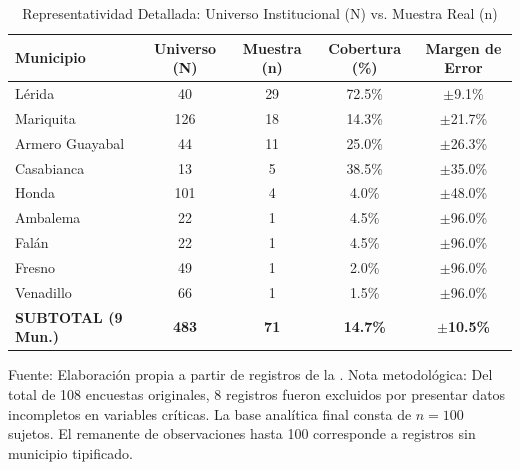 \documentclass[11pt,a4paper]{article}
\begin{document}
\begin{table}[H]
\centering
\caption{Representatividad Detallada: Universo Institucional (N) vs. Muestra Real (n)}
\small
\begin{tabular}{@{}lcccc@{}}
\toprule
\textbf{Municipio} & \textbf{Universo (N)} & \textbf{Muestra (n)} & \textbf{Cobertura (\%)} & \textbf{Margen de Error} \\ \midrule
L\'erida             & 40                     & 29                   & 72.5\%                     & $\pm$9.1\%               \\
Mariquita          & 126                    & 18                   & 14.3\%                     & $\pm$21.7\%              \\
Armero Guayabal    & 44                     & 11                   & 25.0\%                     & $\pm$26.3\%              \\
Casabianca         & 13                     & 5                    & 38.5\%                     & $\pm$35.0\%              \\
Honda              & 101                    & 4                    & 4.0\%                      & $\pm$48.0\%              \\
Ambalema           & 22                     & 1                    & 4.5\%                      & $\pm$96.0\%              \\
Fal\'an              & 22                     & 1                    & 4.5\%                      & $\pm$96.0\%              \\
Fresno             & 49                     & 1                    & 2.0\%                      & $\pm$96.0\%              \\
Venadillo          & 66                     & 1                    & 1.5\%                      & $\pm$96.0\%              \\ \midrule
\textbf{SUBTOTAL (9 Mun.)} & \textbf{483}   & \textbf{71}          & \textbf{14.7\%}            & \textbf{$\pm$10.5\%}     \\ \bottomrule
\end{tabular}
\par\smallskip
\footnotesize{Fuente: Elaboraci\'on propia a partir de registros de la \citet{camara2025}. Nota metodológica: Del total de 108 encuestas originales, 8 registros fueron excluidos por presentar datos incompletos en variables críticas. La base analítica final consta de $n = 100$ sujetos. El remanente de observaciones hasta 100 corresponde a registros sin municipio tipificado.}
\end{table}
\end{document}
